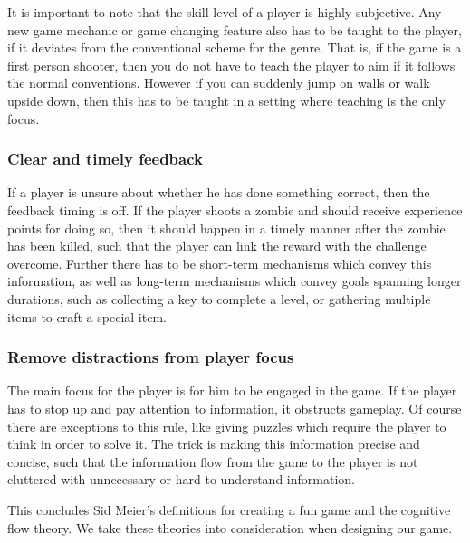It is important to note that the skill level of a player is highly subjective.
Any new game mechanic or game changing feature also has to be taught to the player, if it deviates from the conventional scheme for the genre.
That is, if the game is a first person shooter, then you do not have to teach
the player to aim if it follows the normal conventions. However if you can suddenly
jump on walls or walk upside down, then this has to be taught in a setting
where teaching is the only focus.

\subsubsection{Clear and timely feedback}
If a player is unsure about whether he has done something correct, then the feedback timing is off.
If the player shoots a zombie and should receive experience points for doing so, then it should happen in a timely manner after the zombie has been killed, such that the player can link the reward with the challenge overcome.
Further there has to be short-term mechanisms which convey this information, as well as long-term mechanisms which convey goals spanning longer durations,
such as collecting a key to complete a level, or gathering multiple items to craft a special item.

\subsubsection{Remove distractions from player focus}\label{introductions:makingthegamefun:removedistractionsfromplayerfocus}
The main focus for the player is for him to be engaged in the game.
If the player has to stop up and pay attention to information, it obstructs gameplay.
Of course there are exceptions to this rule, like giving puzzles which require the player to think in order to solve it.
The trick is making this information precise and concise, such that the
information flow from the game to the player is not cluttered with unnecessary or hard to understand information.

This concludes Sid Meier's definitions for creating a fun game and the
cognitive flow theory.
We take these theories into consideration when designing our game.
